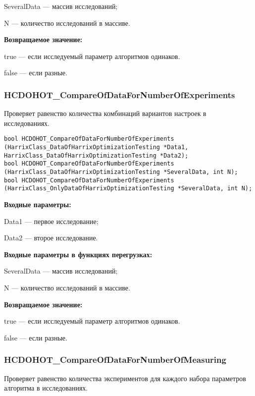 \documentclass[a4paper,12pt]{article}
\begin{document}
SeveralData --- массив исследований;
 
N --- количество исследований в массиве.

\textbf{Возвращаемое значение:}

true --- если исследуемый параметр алгоритмов одинаков.
 
false --- если разные.


\subsubsection{HCDOHOT\_CompareOfDataForNumberOfExperiments}\label{HCDOHOT_CompareOfDataForNumberOfExperiments}

Проверяет равенство количества комбинаций вариантов настроек в исследованиях.


\begin{lstlisting}[label=code_syntax_HCDOHOT_CompareOfDataForNumberOfExperiments,caption=Синтаксис]
bool HCDOHOT_CompareOfDataForNumberOfExperiments (HarrixClass_DataOfHarrixOptimizationTesting *Data1, HarrixClass_DataOfHarrixOptimizationTesting *Data2);
bool HCDOHOT_CompareOfDataForNumberOfExperiments (HarrixClass_DataOfHarrixOptimizationTesting *SeveralData, int N);
bool HCDOHOT_CompareOfDataForNumberOfExperiments (HarrixClass_OnlyDataOfHarrixOptimizationTesting *SeveralData, int N);
\end{lstlisting}

\textbf{Входные параметры:}

Data1 --- первое исследование;
 
Data2 --- второе исследование.
	 
\textbf{Входные параметры в функциях перегрузках:}

SeveralData --- массив исследований;
 
N --- количество исследований в массиве.

\textbf{Возвращаемое значение:}

true --- если исследуемый параметр алгоритмов одинаков.
 
false --- если разные.


\subsubsection{HCDOHOT\_CompareOfDataForNumberOfMeasuring}\label{HCDOHOT_CompareOfDataForNumberOfMeasuring}

Проверяет равенство количества экспериментов для каждого набора параметров алгоритма в исследованиях.
\end{document}
